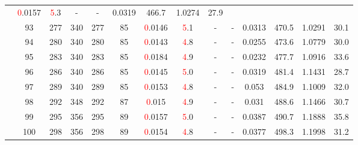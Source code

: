 \begin{table}[htb]
{\begin{tabular}{|c|c|c|c|c|c|c|c|c|c|c|c|c|c|}
 & \textcolor{red}0.0157 & \textcolor{red}5.3
 & - & -
 & 0.0319 & 466.7
 & 1.0274 & 27.9
 \\
 & 
93 & 277 & 340 & 277 & 85
 & \textcolor{red}0.0146 & \textcolor{red}5.1
 & - & -
 & 0.0313 & 470.5
 & 1.0291 & 30.1
 \\
 & 
94 & 280 & 340 & 280 & 85
 & \textcolor{red}0.0143 & \textcolor{red}4.8
 & - & -
 & 0.0255 & 473.6
 & 1.0779 & 30.0
 \\
 & 
95 & 283 & 340 & 283 & 85
 & \textcolor{red}0.0184 & \textcolor{red}4.9
 & - & -
 & 0.0232 & 477.7
 & 1.0916 & 33.6
 \\
 & 
96 & 286 & 340 & 286 & 85
 & \textcolor{red}0.0145 & \textcolor{red}5.0
 & - & -
 & 0.0319 & 481.4
 & 1.1431 & 28.7
 \\
 & 
97 & 289 & 340 & 289 & 85
 & \textcolor{red}0.0153 & \textcolor{red}4.8
 & - & -
 & 0.053 & 484.9
 & 1.1009 & 32.0
 \\
 & 
98 & 292 & 348 & 292 & 87
 & \textcolor{red}0.015 & \textcolor{red}4.9
 & - & -
 & 0.031 & 488.6
 & 1.1466 & 30.7
 \\
 & 
99 & 295 & 356 & 295 & 89
 & \textcolor{red}0.0157 & \textcolor{red}5.0
 & - & -
 & 0.0387 & 490.7
 & 1.1888 & 35.8
 \\
 & 
100 & 298 & 356 & 298 & 89
 & \textcolor{red}0.0154 & \textcolor{red}4.8
 & - & -
 & 0.0377 & 498.3
 & 1.1998 & 31.2
 \\
\hline
\end{tabular}}
\end{table}